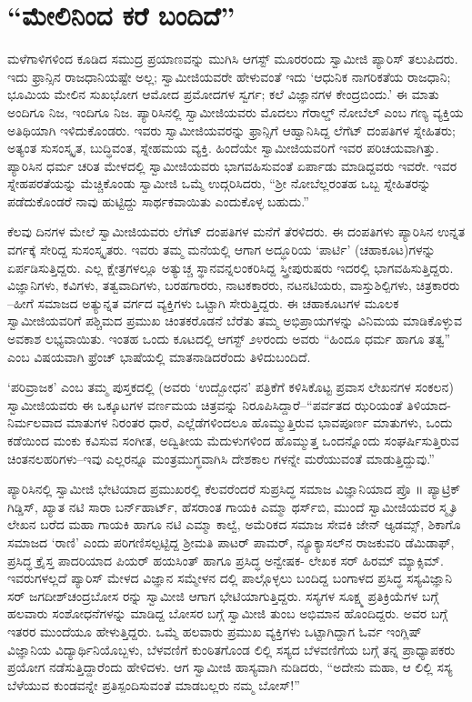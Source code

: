 
\chapter{“ಮೇಲಿನಿಂದ ಕರೆ ಬಂದಿದೆ”}

\noindent

ಮಳೆಗಾಳಿಗಳಿಂದ ಕೂಡಿದ ಸಮುದ್ರ ಪ್ರಯಾಣವನ್ನು ಮುಗಿಸಿ ಆಗಸ್ಟ್ ಮೂರರಂದು ಸ್ವಾಮೀಜಿ ಪ್ಯಾರಿಸ್ ತಲುಪಿದರು. ಇದು ಫ್ರಾನ್ಸಿನ ರಾಜಧಾನಿಯಷ್ಟೇ ಅಲ್ಲ; ಸ್ವಾಮೀಜಿಯವರೇ ಹೇಳುವಂತೆ ಇದು ‘ಆಧುನಿಕ ನಾಗರಿಕತೆಯ ರಾಜಧಾನಿ; ಭೂಮಿಯ ಮೇಲಿನ ಸುಖಭೋಗ ಆಮೋದ ಪ್ರಮೋದಗಳ ಸ್ವರ್ಗ; ಕಲೆ ವಿಜ್ಞಾನಗಳ ಕೇಂದ್ರಬಿಂದು.’ ಈ ಮಾತು ಅಂದಿಗೂ ನಿಜ, ಇಂದಿಗೂ ನಿಜ. ಪ್ಯಾರಿಸಿನಲ್ಲಿ ಸ್ವಾಮೀಜಿಯವರು ಮೊದಲು ಗೆರಾಲ್ಡ್ ನೋಬೆಲ್ ಎಂಬ ಗಣ್ಯ ವ್ಯಕ್ತಿಯ ಅತಿಥಿಯಾಗಿ ಇಳಿದುಕೊಂಡರು. ಇವರು ಸ್ವಾಮೀಜಿಯವರನ್ನು ಫ್ರಾನ್ಸಿಗೆ ಆಹ್ವಾನಿಸಿದ್ದ ಲೆಗೆಟ್ ದಂಪತಿಗಳ ಸ್ನೇಹಿತರು; ಅತ್ಯಂತ ಸುಸಂಸ್ಕೃತ, ಬುದ್ಧಿವಂತ, ಸ್ನೇಹಮಯ ವ್ಯಕ್ತಿ. ಹಿಂದೆಯೇ ಸ್ವಾಮೀಜಿಯವರಿಗೆ ಇವರ ಪರಿಚಯವಾಗಿತ್ತು. ಪ್ಯಾರಿಸಿನ ಧರ್ಮ ಚರಿತ ಮೇಳದಲ್ಲಿ ಸ್ವಾಮೀಜಿಯವರು ಭಾಗವಹಿಸುವಂತೆ ಏರ್ಪಾಡು ಮಾಡಿದ್ದವರು ಇವರೇ. ಇವರ ಸ್ನೇಹಪರತೆಯನ್ನು ಮೆಚ್ಚಿಕೊಂಡು ಸ್ವಾಮೀಜಿ ಒಮ್ಮೆ ಉದ್ಗರಿಸಿದರು, “ಶ್ರೀ ನೋಬೆಲ್ಲರಂತಹ ಒಬ್ಬ ಸ್ನೇಹಿತರನ್ನು ಪಡೆದುಕೊಂಡರೆ ನಾವು ಹುಟ್ಟಿದ್ದು ಸಾರ್ಥಕವಾಯಿತು ಎಂದುಕೊಳ್ಳ ಬಹುದು.”

ಕೆಲವು ದಿನಗಳ ಮೇಲೆ ಸ್ವಾಮೀಜಿಯವರು ಲೆಗೆಟ್ ದಂಪತಿಗಳ ಮನೆಗೆ ತೆರಳಿದರು. ಈ ದಂಪತಿಗಳು ಪ್ಯಾರಿಸಿನ ಉನ್ನತ ವರ್ಗಕ್ಕೆ ಸೇರಿದ್ದ ಸುಸಂಸ್ಕೃತರು. ಇವರು ತಮ್ಮ ಮನೆಯಲ್ಲಿ ಆಗಾಗ ಅದ್ಧೂರಿಯ ‘ಪಾರ್ಟಿ’ (ಚಹಾಕೂಟ)ಗಳನ್ನು ಏರ್ಪಡಿಸುತ್ತಿದ್ದರು. ಎಲ್ಲ ಕ್ಷೇತ್ರಗಳಲ್ಲೂ ಅತ್ಯುಚ್ಚ ಸ್ಥಾನವನ್ನಲಂಕರಿಸಿದ್ದ ಸ್ತ್ರೀಪುರುಷರು ಇದರಲ್ಲಿ ಭಾಗವಹಿಸುತ್ತಿದ್ದರು. ವಿಜ್ಞಾನಿಗಳು, ಕವಿಗಳು, ತತ್ವವಾದಿಗಳು, ಬರಹಗಾರರು, ನಾಟಕಕಾರರು, ನಟನಟಿಯರು, ವಾಸ್ತುಶಿಲ್ಪಿಗಳು, ಚಿತ್ರಕಾರರು –ಹೀಗೆ ಸಮಾಜದ ಅತ್ಯುನ್ನತ ವರ್ಗದ ವ್ಯಕ್ತಿಗಳು ಒಟ್ಟಾಗಿ ಸೇರುತ್ತಿದ್ದರು. ಈ ಚಹಾಕೂಟಗಳ ಮೂಲಕ ಸ್ವಾಮೀಜಿಯವರಿಗೆ ಪಶ್ಚಿಮದ ಪ್ರಮುಖ ಚಿಂತಕರೊಡನೆ ಬೆರೆತು ತಮ್ಮ ಅಭಿಪ್ರಾಯಗಳನ್ನು ವಿನಿಮಯ ಮಾಡಿಕೊಳ್ಳುವ ಅವಕಾಶ ಲಭ್ಯವಾಯಿತು. ಇಂತಹ ಒಂದು ಕೂಟದಲ್ಲಿ ಆಗಸ್ಟ್ ೨೪ರಂದು ಅವರು “ಹಿಂದೂ ಧರ್ಮ ಹಾಗೂ ತತ್ವ” ಎಂಬ ವಿಷಯವಾಗಿ ಫ್ರೆಂಚ್ ಭಾಷೆಯಲ್ಲಿ ಮಾತನಾಡಿದರೆಂದು ತಿಳಿದುಬಂದಿದೆ.

‘ಪರಿವ್ರಾಜಕ’ ಎಂಬ ತಮ್ಮ ಪುಸ್ತಕದಲ್ಲಿ (ಅವರು ‘ಉದ್ಬೋಧನ’ ಪತ್ರಿಕೆಗೆ ಕಳಿಸಿಕೊಟ್ಟ ಪ್ರವಾಸ ಲೇಖನಗಳ ಸಂಕಲನ) ಸ್ವಾಮೀಜಿಯವರು ಈ ಒಕ್ಕೂಟಗಳ ವರ್ಣಮಯ ಚಿತ್ರವನ್ನು ನಿರೂಪಿಸಿದ್ದಾರೆ–“ಪರ್ವತದ ಝರಿಯಂತೆ ತಿಳಿಯಾದ-ನಿರ್ಮಲವಾದ ಮಾತುಗಳ ನಿರಂತರ ಧಾರೆ, ಎಲ್ಲೆಡೆಗಳಿಂದಲೂ ಹೊಮ್ಮುತ್ತಿರುವ ಭಾವಪೂರ್ಣ ಮಾತುಗಳು, ಒಂದು ಕಡೆಯಿಂದ ಮಂಕು ಕವಿಸುವ ಸಂಗೀತ, ಅದ್ವಿತೀಯ ಮೆದುಳುಗಳಿಂದ ಹೊಮ್ಮುತ್ತ ಒಂದನ್ನೊಂದು ಸಂಘರ್ಷಿಸುತ್ತಿರುವ ಚಿಂತನಲಹರಿಗಳು–ಇವು ಎಲ್ಲರನ್ನೂ ಮಂತ್ರಮುಗ್ಧವಾಗಿಸಿ ದೇಶಕಾಲ ಗಳನ್ನೇ ಮರೆಯುವಂತೆ ಮಾಡುತ್ತಿದ್ದುವು.”

ಪ್ಯಾರಿಸಿನಲ್ಲಿ ಸ್ವಾಮೀಜಿ ಭೇಟಿಯಾದ ಪ್ರಮುಖರಲ್ಲಿ ಕೆಲವರೆಂದರೆ ಸುಪ್ರಸಿದ್ಧ ಸಮಾಜ ವಿಜ್ಞಾನಿಯಾದ ಪ್ರೊ ॥ ಪ್ಯಾಟ್ರಿಕ್ ಗಿಡ್ಡಿಸ್, ಖ್ಯಾತ ನಟಿ ಸಾರಾ ಬರ್ನ್​ಹಾರ್ಟ್, ಹೆಸರಾಂತ ಗಾಯಕಿ ಎಮ್ಮಾ ಥರ್ಸ್​ಬಿ, ಮುಂದೆ ಸ್ವಾಮೀಜಿಯವರ ಸ್ಮೃತಿ ಲೇಖನ ಬರೆದ ಮಹಾ ಗಾಯಕಿ ಹಾಗೂ ನಟಿ ಎಮ್ಮಾ ಕಾಲ್ವೆ, ಅಮೆರಿಕದ ಸಮಾಜ ಸೇವಕಿ ಜೇನ್ ಆ್ಯಡಮ್ಸ್, ಶಿಕಾಗೊ ಸಮಾಜದ ‘ರಾಣಿ’ ಎಂದು ಪರಿಗಣಿಸಲ್ಪಟ್ಟಿದ್ದ ಶ್ರೀಮತಿ ಪಾಟರ್ ಪಾಮರ್, ನ್ಯೂಕ್ಯಾಸಲ್​ನ ರಾಜಕುವರಿ ಡೆಮಿಡಾಫ್, ಪ್ರಸಿದ್ಧ ಕ್ರೈಸ್ತ ಪಾದರಿಯಾದ ಪಿಯರ್ ಹಯಸಿಂತ್ ಹಾಗೂ ಪ್ರಸಿದ್ಧ ಅನ್ವೇಷಕ- ಲೇಖಕ ಸರ್ ಹಿರಮ್ ಮ್ಯಾಕ್ಸಿಮ್. ಇವರುಗಳಲ್ಲದೆ ಪ್ಯಾರಿಸ್ ಮೇಳದ ವಿಜ್ಞಾನ ಸಮ್ಮೇಳನ ದಲ್ಲಿ ಪಾಲ್ಗೊಳ್ಳಲು ಬಂದಿದ್ದ ಬಂಗಾಳದ ಪ್ರಸಿದ್ಧ ಸಸ್ಯವಿಜ್ಞಾನಿ ಸರ್ ಜಗದೀಶ್​ಚಂದ್ರಬೋಸ ರನ್ನು ಸ್ವಾಮೀಜಿ ಆಗಾಗ ಭೇಟಿಯಾಗುತ್ತಿದ್ದರು. ಸಸ್ಯಗಳ ಸೂಕ್ಷ್ಮ ಪ್ರತಿಕ್ರಿಯೆಗಳ ಬಗ್ಗೆ ಹಲವಾರು ಸಂಶೋಧನೆಗಳನ್ನು ಮಾಡಿದ್ದ ಬೋಸರ ಬಗ್ಗೆ ಸ್ವಾಮೀಜಿ ತುಂಬ ಅಭಿಮಾನ ಹೊಂದಿದ್ದರು. ಅವರ ಬಗ್ಗೆ ಇತರರ ಮುಂದೆಯೂ ಹೇಳುತ್ತಿದ್ದರು. ಒಮ್ಮೆ ಹಲವಾರು ಪ್ರಮುಖ ವ್ಯಕ್ತಿಗಳು ಒಟ್ಟಾಗಿದ್ದಾಗ ಓರ್ವ ಇಂಗ್ಲಿಷ್ ವಿಜ್ಞಾನಿಯ ವಿದ್ಯಾರ್ಥಿನಿಯೊಬ್ಬಳು, ಬೆಳವಣಿಗೆ ಕುಂಠಿತಗೊಂಡ ಲಿಲ್ಲಿ ಸಸ್ಯದ ಬೆಳವಣಿಗೆಯ ಬಗ್ಗೆ ತನ್ನ ಪ್ರಾಧ್ಯಾಪಕರು ಪ್ರಯೋಗ ನಡೆಸುತ್ತಿದ್ದಾರೆಂದು ಹೇಳಿದಳು. ಆಗ ಸ್ವಾಮೀಜಿ ಹಾಸ್ಯವಾಗಿ ನುಡಿದರು, “ಅದೇನು ಮಹಾ, ಆ ಲಿಲ್ಲಿ ಸಸ್ಯ ಬೆಳೆಯುವ ಕುಂಡವನ್ನೇ ಪ್ರತಿಸ್ಪಂದಿಸುವಂತೆ ಮಾಡಬಲ್ಲರು ನಮ್ಮ ಬೋಸ್!”


